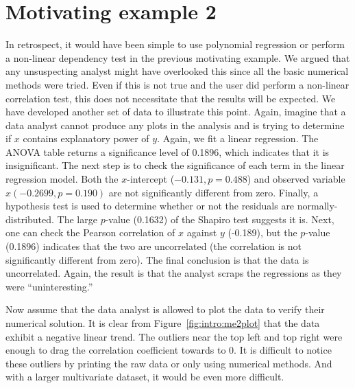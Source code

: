 \section{Motivating example 2}
\label{sec:intro:me2}

In retrospect, it would have been simple to use polynomial regression or perform a non-linear dependency test in the previous motivating example. We argued that any unsuspecting analyst might have overlooked this since all the basic numerical methods were tried. Even if this is not true and the user did perform a non-linear correlation test, this does not necessitate that the results will be expected. We have developed another set of data to illustrate this point. Again, imagine that a data analyst cannot produce any plots in the analysis and is trying to determine if $x$ contains explanatory power of $y$. Again, we fit a linear regression. The ANOVA table returns a significance level of 0.1896, which indicates that it is insignificant. The next step is to check the significance of each term in the linear regression model. Both the $x$-intercept ($-0.131, p = 0.488$) and observed variable $x (-0.2699, p = 0.190)$ are not significantly different from zero. Finally, a hypothesis test is used to determine whether or not the residuals are normally-distributed. The large $p$-value (0.1632) of the Shapiro test suggests it is. Next, one can check the Pearson correlation of $x$ against $y$ (-0.189), but the $p$-value (0.1896) indicates that the two are uncorrelated (the correlation is not significantly different from zero). The final conclusion is that the data is uncorrelated. Again, the result is that the analyst scraps the regressions as they were ``uninteresting.''

Now assume that the data analyst is allowed to plot the data to verify their numerical solution. It is clear from Figure~\ref{fig:intro:me2plot} that the data exhibit a negative linear trend. The outliers near the top left and top right were enough to drag the correlation coefficient towards to 0. It is difficult to notice these outliers by printing the raw data or only using numerical methods. And with a larger multivariate dataset, it would be even more difficult.

